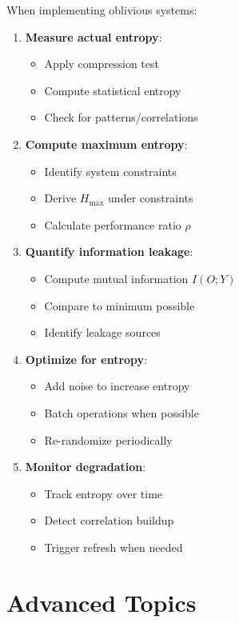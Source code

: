 \documentclass[11pt,final,hidelinks]{article}
\begin{document}
When implementing oblivious systems:
\begin{enumerate}
    \item \textbf{Measure actual entropy}: 
        \begin{itemize}
            \item Apply compression test
            \item Compute statistical entropy
            \item Check for patterns/correlations
        \end{itemize}
    \item \textbf{Compute maximum entropy}:
        \begin{itemize}
            \item Identify system constraints
            \item Derive $H_{\max}$ under constraints
            \item Calculate performance ratio $\rho$
        \end{itemize}
    \item \textbf{Quantify information leakage}:
        \begin{itemize}
            \item Compute mutual information $I(O; Y)$
            \item Compare to minimum possible
            \item Identify leakage sources
        \end{itemize}
    \item \textbf{Optimize for entropy}:
        \begin{itemize}
            \item Add noise to increase entropy
            \item Batch operations when possible
            \item Re-randomize periodically
        \end{itemize}
    \item \textbf{Monitor degradation}:
        \begin{itemize}
            \item Track entropy over time
            \item Detect correlation buildup
            \item Trigger refresh when needed
        \end{itemize}
\end{enumerate}

\section{Advanced Topics}
\end{document}
